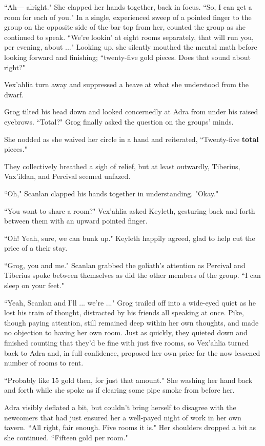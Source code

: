 ``Ah--- alright." She clapped her hands together, back in focus. ``So, I can get a room for each of you." In a single, experienced sweep of a pointed finger to the group on the opposite side of the bar top from her, counted the group as she continued to speak. ``We're lookin' at eight rooms separately, that will run you, per evening, about ..." Looking up, she silently mouthed the mental math before looking forward and finishing; ``twenty-five gold pieces. Does that sound about right?"

Vex'ahlia turn away and suppressed a heave at what she understood from the dwarf.

Grog tilted his head down and looked concernedly at Adra from under his raised eyebrows. ``Total?" Grog finally asked the question on the groups' minds.

She nodded as she waived her circle in a hand and reiterated, ``Twenty-five \textbf{total} pieces." 

They collectively breathed a sigh of relief, but at least outwardly, Tiberius, Vax'ildan, and Percival seemed unfazed.

``Oh," Scanlan clapped his hands together in understanding. "Okay."

``You want to share a room?" Vex'ahlia asked Keyleth, gesturing back and forth between them with an upward pointed finger.

``Oh! Yeah, sure, we can bunk up." Keyleth happily agreed, glad to help cut the price of a their stay.

``Grog, you and me." Scanlan grabbed the goliath's attention as Percival and Tiberius spoke between themselves as did the other members of the group. ``I can sleep on your feet."

``Yeah, Scanlan and I'll ... we're ..." Grog trailed off into a wide-eyed quiet as he lost his train of thought, distracted by his friends all speaking at once. Pike, though paying attention, still remained deep within her own thoughts, and made no objection to having her own room. Just as quickly, they quieted down and finished counting that they'd be fine with just five rooms, so Vex'ahlia turned back to Adra and, in full confidence, proposed her own price for the now lessened number of rooms to rent.

``Probably like 15 gold then, for just that amount." She washing her hand back and forth while she spoke as if clearing some pipe smoke from before her.

Adra visibly deflated a bit, but couldn't bring herself to disagree with the newcomers that had just ensured her a well-payed night of work in her own tavern. ``All right, fair enough. Five rooms it is." Her shoulders dropped a bit as she continued. ``Fifteen gold per room." 

